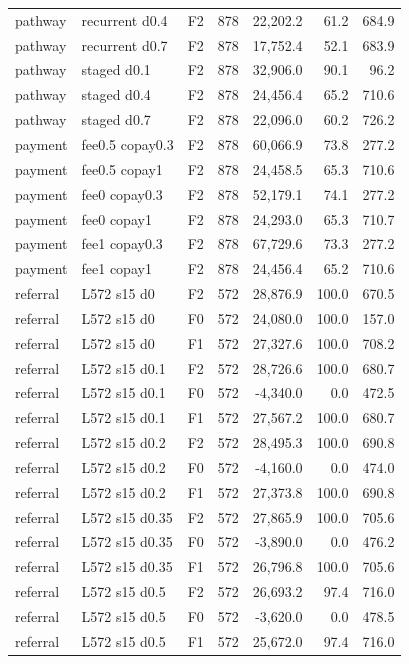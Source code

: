 \begin{longtable}{p{1.8cm}p{3.35cm}lrrrr}
pathway & recurrent d0.4 & F2 & 878 & 22,202.2 & 61.2 & 684.9\\
pathway & recurrent d0.7 & F2 & 878 & 17,752.4 & 52.1 & 683.9\\
pathway & staged d0.1 & F2 & 878 & 32,906.0 & 90.1 & 96.2\\
pathway & staged d0.4 & F2 & 878 & 24,456.4 & 65.2 & 710.6\\
pathway & staged d0.7 & F2 & 878 & 22,096.0 & 60.2 & 726.2\\
payment & fee0.5 copay0.3 & F2 & 878 & 60,066.9 & 73.8 & 277.2\\
payment & fee0.5 copay1 & F2 & 878 & 24,458.5 & 65.3 & 710.6\\
payment & fee0 copay0.3 & F2 & 878 & 52,179.1 & 74.1 & 277.2\\
payment & fee0 copay1 & F2 & 878 & 24,293.0 & 65.3 & 710.7\\
payment & fee1 copay0.3 & F2 & 878 & 67,729.6 & 73.3 & 277.2\\
payment & fee1 copay1 & F2 & 878 & 24,456.4 & 65.2 & 710.6\\
referral & L572 s15 d0 & F2 & 572 & 28,876.9 & 100.0 & 670.5\\
referral & L572 s15 d0 & F0 & 572 & 24,080.0 & 100.0 & 157.0\\
referral & L572 s15 d0 & F1 & 572 & 27,327.6 & 100.0 & 708.2\\
referral & L572 s15 d0.1 & F2 & 572 & 28,726.6 & 100.0 & 680.7\\
referral & L572 s15 d0.1 & F0 & 572 & -4,340.0 & 0.0 & 472.5\\
referral & L572 s15 d0.1 & F1 & 572 & 27,567.2 & 100.0 & 680.7\\
referral & L572 s15 d0.2 & F2 & 572 & 28,495.3 & 100.0 & 690.8\\
referral & L572 s15 d0.2 & F0 & 572 & -4,160.0 & 0.0 & 474.0\\
referral & L572 s15 d0.2 & F1 & 572 & 27,373.8 & 100.0 & 690.8\\
referral & L572 s15 d0.35 & F2 & 572 & 27,865.9 & 100.0 & 705.6\\
referral & L572 s15 d0.35 & F0 & 572 & -3,890.0 & 0.0 & 476.2\\
referral & L572 s15 d0.35 & F1 & 572 & 26,796.8 & 100.0 & 705.6\\
referral & L572 s15 d0.5 & F2 & 572 & 26,693.2 & 97.4 & 716.0\\
referral & L572 s15 d0.5 & F0 & 572 & -3,620.0 & 0.0 & 478.5\\
referral & L572 s15 d0.5 & F1 & 572 & 25,672.0 & 97.4 & 716.0\\

\end{longtable}
